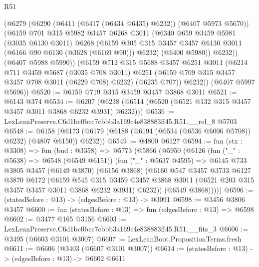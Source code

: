 \begin{lexlean}{R51}
\begin{coremodule}
          (@6279
            (@6290 (@6411 (@6417 (@6434 @6435) @6232)) (@6407 @5973 @5670))
            (@6159
              @701
              @315
              @5982
              @3457
              @6268
              @3011
              (@6340
                @659
                @3459
                @5981
                (@3035 @6130 @3011)
                @6268
                (@6159
                  @305
                  @315
                  @3457
                  @3457
                  @6130
                  @3011
                  (@6166 @90 @6130 (@3628 (@6169 @90)))
                  @6232)
                (@6400 @5980))
              @6232))
          (@6407 @5988 @5990))
        (@6159
          @712
          @315
          @5688
          @3457
          @6251
          @3011
          (@6214
            @711
            @3459
            @5687
            (@3035 @708 @3011)
            @6251
            (@6159 @709 @315 @3457 @3457 @708 @3011 (@6229 @708) @6232)
            (@6235 @707))
          @6232))
      (@6407 @5997 @5696))
@6520 := @6159 @719 @315 @3459 @3457 @3868 @3011
@6521 := @6143 @374
@6534 := @6207 (@6238 (@6514 (@6520 (@6521 @132 @315 @3457 @3457 @3011 @3868 @6232 @3931) @6232)))
@6536 := LexLeanPreserve.C6d1bc0bcc7cbbb3a169c4e838883ff45.R51.__rel_8 @5703
@6548 := @6158 (@6173 (@6179 (@6188 (@6194 (@6534 (@6536 @6006 @5708)) @6232) (@4807 @6150)) @6232))
@6549 := @4800 @6127
@6594 := fun (ctx : @3308) =>
  fun (bud : @3358) =>
  @5773
    (@5866
      (@5950
        (@6126
          (fun ("_" : @5638) => @6548 (@6549 @6151))
          (fun ("_" : @5637 @4595) =>
          @6145
            @733
            @3805
            @3457
            (@6149 @3870)
            (@6156 @3868)
            (@6160
              @547
              @3457
              @3733
              @6127
              @3870
              @6172
              (@6159
                @545
                @315
                @3459
                @3457
                @3868
                @3011
                (@6521 @203 @315 @3457 @3457 @3011 @3868 @6232 @3931)
                @6232))
            (@6549 @3868)))))
@6596 := (statesBefore : @13) -> (edgesBefore : @13) -> @3091
@6598 := @3456 @3806 @3457
@6600 := fun (statesBefore : @13) => fun (edgesBefore : @13) => @6598
@6602 := @3477 @165 @3156
@6603 := LexLeanPreserve.C6d1bc0bcc7cbbb3a169c4e838883ff45.R51.__fits_3
@6606 := @3495 (@6603 @3101 @3007)
@6607 := LexLeanBoot.PropositionTerms.fresh
@6611 := @6606 (@3403 (@6607 @3101 @3007))
@6614 := (statesBefore : @13) -> (edgesBefore : @13) -> @6602 @6611

\end{coremodule}
\end{lexlean}
